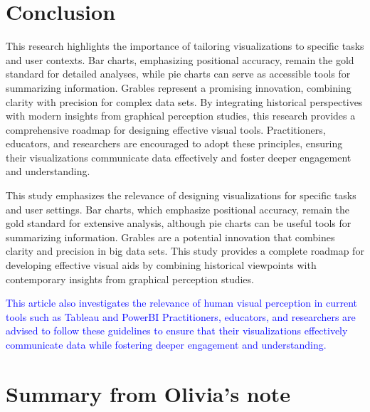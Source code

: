 \documentclass[
  10pt,
  letterpaper,
  twocolumn]{article}
\newcommand{\mt}[1]{{\textcolor{blue}{#1}}}
\begin{document}
\hypertarget{conclusion}{%
\section{Conclusion}\label{conclusion}}

This research highlights the importance of tailoring visualizations to
specific tasks and user contexts. Bar charts, emphasizing positional
accuracy, remain the gold standard for detailed analyses, while pie
charts can serve as accessible tools for summarizing information.
Grables represent a promising innovation, combining clarity with
precision for complex data sets. By integrating historical perspectives
with modern insights from graphical perception studies, this research
provides a comprehensive roadmap for designing effective visual tools.
Practitioners, educators, and researchers are encouraged to adopt these
principles, ensuring their visualizations communicate data effectively
and foster deeper engagement and understanding.

This study emphasizes the relevance of designing visualizations for
specific tasks and user settings. Bar charts, which emphasize positional
accuracy, remain the gold standard for extensive analysis, although pie
charts can be useful tools for summarizing information. Grables are a
potential innovation that combines clarity and precision in big data
sets. This study provides a complete roadmap for developing effective
visual aids by combining historical viewpoints with contemporary
insights from graphical perception studies.

\mt{This article also investigates the relevance of human visual
perception in current tools such as Tableau and PowerBI Practitioners,
educators, and researchers are advised to follow these guidelines to
ensure that their visualizations effectively communicate data while
fostering deeper engagement and understanding.}

\hypertarget{summary-from-olivias-note}{%
\section{Summary from Olivia's note}\label{summary-from-olivias-note}}
\end{document}
